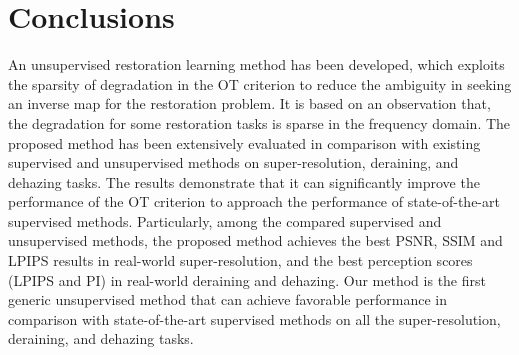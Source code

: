 \documentclass[10pt,journal,compsoc]{IEEEtran}
\begin{document}
\section{Conclusions}

An unsupervised restoration learning method
has been developed, which exploits the sparsity of
degradation in the OT criterion to 
reduce the ambiguity in seeking an inverse map for 
the restoration problem. It is based on an observation
that, the degradation for some restoration tasks is sparse 
in the frequency domain. 
The proposed method has been extensively evaluated in 
comparison with existing supervised and unsupervised methods
on super-resolution, deraining, and dehazing tasks.
The results demonstrate that it can significantly
improve the performance of the OT criterion to approach 
the performance of state-of-the-art supervised methods.
Particularly, among the compared supervised and unsupervised methods, 
the proposed method achieves the best 
PSNR, SSIM and LPIPS results in real-world super-resolution,
and the best perception scores (LPIPS and PI) in 
real-world deraining and dehazing.
Our method is the first generic unsupervised method
that can achieve favorable performance in comparison with
state-of-the-art supervised methods on all the super-resolution, 
deraining, and dehazing tasks.

\ifCLASSOPTIONcaptionsoff
  \newpage
\fi





%
%
%
\end{document}
